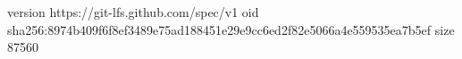 version https://git-lfs.github.com/spec/v1
oid sha256:8974b409f6f8ef3489e75ad188451e29e9cc6ed2f82e5066a4e559535ea7b5ef
size 87560
